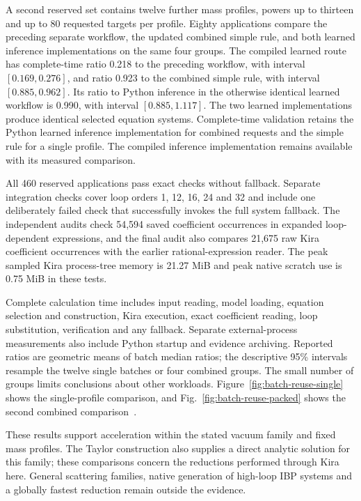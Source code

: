 A second reserved set contains twelve further mass profiles, powers up
to thirteen and up to 80 requested targets per profile. Eighty
applications compare the preceding separate workflow, the updated
combined simple rule, and both learned inference implementations on the same
four groups. The compiled learned route has complete-time ratio
0.218 to the preceding workflow, with interval \([0.169,0.276]\), and
ratio 0.923 to the combined simple rule, with interval
\([0.885,0.962]\). Its ratio to Python inference in the otherwise
identical learned workflow is 0.990, with interval
\([0.885,1.117]\). The two learned implementations produce identical selected
equation systems. Complete-time validation retains the Python learned inference implementation for combined requests and the simple rule for a single profile. The compiled inference implementation remains available with its measured comparison.

All 460 reserved applications pass exact checks without fallback.
Separate integration checks cover loop orders 1, 12, 16, 24 and 32 and
include one deliberately failed check that successfully invokes the full
system fallback. The independent audits check 54,594 saved
coefficient occurrences in expanded loop-dependent expressions, and the
final audit also compares 21,675 raw Kira coefficient occurrences
with the earlier rational-expression reader. The peak sampled Kira
process-tree memory is 21.27 MiB and peak native scratch use is
0.75 MiB in these tests.

Complete calculation time includes input reading, model loading,
equation selection and construction, Kira execution, exact coefficient
reading, loop substitution, verification and any fallback. Separate
external-process measurements also include Python startup and evidence
archiving. Reported ratios are geometric means of batch median ratios;
the descriptive 95\% intervals resample the twelve single batches or
four combined groups. The small number of groups limits conclusions
about other workloads. Figure~\ref{fig:batch-reuse-single} shows the
single-profile comparison, and Fig.~\ref{fig:batch-reuse-packed} shows
the second combined comparison~\cite{KiraBatchReuseData}.

These results support acceleration within the stated vacuum family and
fixed mass profiles. The Taylor construction also supplies a direct
analytic solution for this family; these comparisons concern the
reductions performed through Kira here. General scattering families,
native generation of high-loop IBP systems and a globally fastest
reduction remain outside the evidence.


